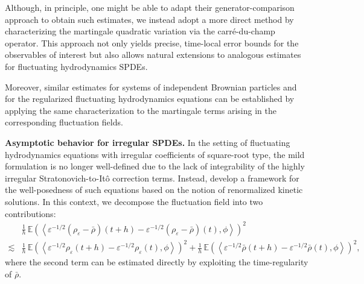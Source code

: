 \documentclass[UTF-8,reqno]{amsart}
\numberwithin{equation}{section}
\begin{document}
Although, in principle, one might be able to adapt their generator-comparison approach to obtain such estimates, we instead adopt a more direct method by characterizing the martingale quadratic variation via the carr\'e-du-champ operator. This approach not only yields precise, time-local error bounds for the observables of interest but also allows natural extensions to analogous estimates for fluctuating hydrodynamics SPDEs.

Moreover, similar estimates for systems of independent Brownian particles and for the regularized fluctuating hydrodynamics equations can be established by applying the same characterization to the martingale terms arising in the corresponding fluctuation fields.





\textbf{Asymptotic behavior for irregular SPDEs. }  
In the setting of fluctuating hydrodynamics equations with irregular coefficients of square-root type, the mild formulation is no longer well-defined due to the lack of integrability of the highly irregular Stratonovich-to-It\^o correction terms. Instead, \cite{FG24} develop a framework for the well-posedness of such equations based on the notion of renormalized kinetic solutions. In this context, we decompose the fluctuation field into two contributions: 
\begin{align*}
&\frac{1}{h} \, \mathbb{E} \left( \left\langle \varepsilon^{-1/2}(\rho_{\varepsilon} - \bar{\rho})(t + h) - \varepsilon^{-1/2}(\rho_{\varepsilon} - \bar{\rho})(t), \phi \right\rangle \right)^2\\ 
\lesssim& \frac{1}{h} \, \mathbb{E} \left( \left\langle \varepsilon^{-1/2} \rho_{\varepsilon}(t + h) - \varepsilon^{-1/2} \rho_{\varepsilon}(t), \phi \right\rangle \right)^2 + \frac{1}{h} \, \mathbb{E} \left( \left\langle \varepsilon^{-1/2} \bar{\rho}(t + h) - \varepsilon^{-1/2} \bar{\rho}(t), \phi \right\rangle \right)^2, 
\end{align*}
where the second term can be estimated directly by exploiting the time-regularity of $\bar{\rho}$.  
\end{document}

